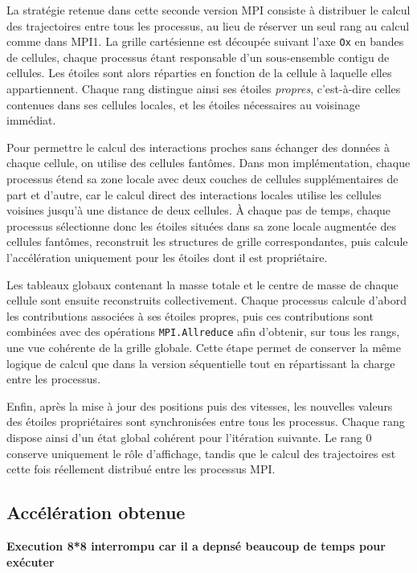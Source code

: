 \documentclass[11pt,a4paper]{article}
\begin{document}
La stratégie retenue dans cette seconde version MPI consiste à distribuer le calcul des trajectoires entre tous les processus, au lieu de réserver un seul rang au calcul comme dans MPI1. La grille cartésienne est découpée suivant l'axe \texttt{Ox} en bandes de cellules, chaque processus étant responsable d'un sous-ensemble contigu de cellules. Les étoiles sont alors réparties en fonction de la cellule à laquelle elles appartiennent. Chaque rang distingue ainsi ses étoiles \emph{propres}, c'est-à-dire celles contenues dans ses cellules locales, et les étoiles nécessaires au voisinage immédiat.

Pour permettre le calcul des interactions proches sans échanger des données à chaque cellule, on utilise des cellules fantômes. Dans mon implémentation, chaque processus étend sa zone locale avec deux couches de cellules supplémentaires de part et d'autre, car le calcul direct des interactions locales utilise les cellules voisines jusqu'à une distance de deux cellules. À chaque pas de temps, chaque processus sélectionne donc les étoiles situées dans sa zone locale augmentée des cellules fantômes, reconstruit les structures de grille correspondantes, puis calcule l'accélération uniquement pour les étoiles dont il est propriétaire.

Les tableaux globaux contenant la masse totale et le centre de masse de chaque cellule sont ensuite reconstruits collectivement. Chaque processus calcule d'abord les contributions associées à ses étoiles propres, puis ces contributions sont combinées avec des opérations \texttt{MPI.Allreduce} afin d'obtenir, sur tous les rangs, une vue cohérente de la grille globale. Cette étape permet de conserver la même logique de calcul que dans la version séquentielle tout en répartissant la charge entre les processus.

Enfin, après la mise à jour des positions puis des vitesses, les nouvelles valeurs des étoiles propriétaires sont synchronisées entre tous les processus. Chaque rang dispose ainsi d'un état global cohérent pour l'itération suivante. Le rang 0 conserve uniquement le rôle d'affichage, tandis que le calcul des trajectoires est cette fois réellement distribué entre les processus MPI.


\subsection{Accélération obtenue}

\textbf{Execution 8*8 interrompu car il
a depnsé beaucoup de temps pour
exécuter}
\end{document}

